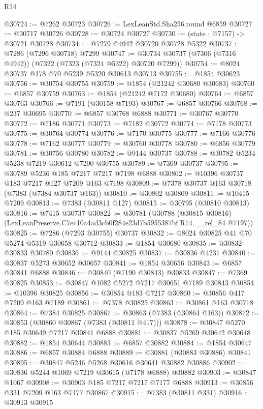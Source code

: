 \begin{lexlean}{R14}
\begin{coremodule}
@30724 := @7262 @30723
@30726 := LexLeanStd.Sha256.round @6859
@30727 := @30717 @30726
@30728 := @30724 @30727
@30730 := (state : @7157) -> @30721 @30728
@30734 := @7279 @4942 @30720 @30728 @5322
@30737 := @7286 (@7296 @30718) @7299
@30747 := @30734 @30737 (@7306 (@7316 @4942)) (@7322 (@7323 (@7324 @5322) @30720 @7299))
@30754 := @8024 @30737 @178 @70 @5239 @5320 @30613 @30713
@30755 := @1854 @30623
@30756 := @30754 @30755
@30759 := @1854 (@21242 @30680 @30683)
@30760 := @6857 @30759
@30763 := @1854 (@21242 @7172 @30680)
@30764 := @6857 @30763
@30766 := @7191 (@30158 @7193)
@30767 := @6857 @30766
@30768 := @237 @30695
@30770 := @6857 @30768 @6888
@30771 := @30767 @30770
@30772 := @7186 @30771
@30773 := @7182 @30772
@30774 := @7178 @30773
@30775 := @30764 @30774
@30776 := @7170 @30775
@30777 := @7166 @30776
@30778 := @7162 @30777
@30779 := @30760 @30778
@30780 := @6856 @30779
@30781 := @30756 @30780
@30782 := @9144 @30737
@30788 := @30782 @5234 @5238 @7219 @30612 @7200 @30755
@30789 := @7369 @30737
@30795 := @30789 @5236 @185 @7217 @7217 @7198 @6888
@30802 := @10396 @30737 @183 @7217 @127 @7209 @163 @7198
@30809 := @7378 @30737 @163 @30718 (@7383 (@7384 @30737 @163))
@30810 := @30802 @30809
@30811 := @10415 @7209
@30813 := @7383 (@30811 @127)
@30815 := @30795 (@30810 @30813)
@30816 := @7415 @30737
@30822 := @30781
    (@30788 (@30815 @30816) (LexLeanPreserve.C7ec10a4ad3cb0f284e23d7b5955387bf.R14.__rel_84 @7197))
@30825 := @7286 (@7293 @30755) @30737
@30832 := @8024 @30825 @41 @70 @5274 @5319 @30658 @30712
@30833 := @1854 @30680
@30835 := @30832 @30833 @30780
@30836 := @9144 @30825
@30837 := @30836 @4231
@30840 := @30837 @5273 @30652 @30657
@30841 := @1854 @30656
@30843 := @6857 @30841 @6888
@30846 := @30840 (@7190 @30843) @30833
@30847 := @7369 @30825
@30853 := @30847 @1082 @5272 @7217 @30651 @7189 @30843
@30854 := @10396 @30825
@30856 := @30854 @183 @7217
@30860 := @30856 @417 @7209 @163 @7189
@30861 := @7378 @30825
@30863 := @30861 @163 @30718
@30864 := @7384 @30825
@30867 := @30863 (@7383 (@30864 @163))
@30872 := @30853 (@30860 @30867 (@7383 (@30811 @417)))
@30878 := @30847 @5270 @185 @30649 @7217 @30841 @6888
@30881 := @30837 @5269 @30642 @30648
@30882 := @1854 @30644
@30883 := @6857 @30882
@30884 := @1854 @30647
@30886 := @6857 @30884 @6888
@30889 := @30881 (@30883 @30886) @30841
@30895 := @30847 @5246 @5268 @30616 @30641 @30882 @30886
@30902 := @30836 @5244 @1069 @7219 @30615 (@7178 @6888) @30882
@30903 := @30847 @1067
@30908 := @30903 @185 @7217 @7217 @7177 @6888
@30913 := @30856 @331 @7209 @163 @7177 @30867
@30915 := @7383 (@30811 @331)
@30916 := @30913 @30915

\end{coremodule}
\end{lexlean}
